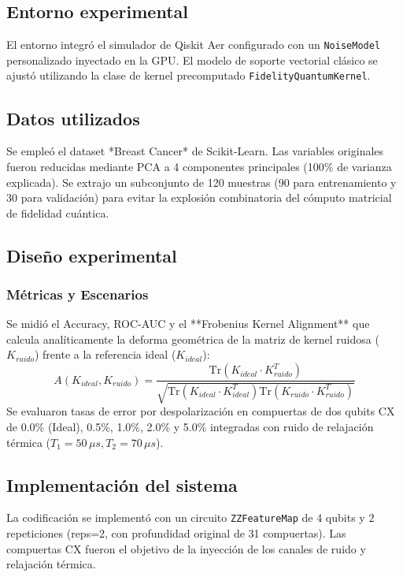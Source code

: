 \documentclass[12pt,oneside]{report}
\begin{document}
\subsection{Entorno experimental}
El entorno integró el simulador de Qiskit Aer configurado con un \texttt{NoiseModel} personalizado inyectado en la GPU. El modelo de soporte vectorial clásico se ajustó utilizando la clase de kernel precomputado \texttt{FidelityQuantumKernel}.

\subsection{Datos utilizados}
Se empleó el dataset *Breast Cancer* de Scikit-Learn. Las variables originales fueron reducidas mediante PCA a 4 componentes principales (100\% de varianza explicada). Se extrajo un subconjunto de 120 muestras (90 para entrenamiento y 30 para validación) para evitar la explosión combinatoria del cómputo matricial de fidelidad cuántica.

\subsection{Diseño experimental}
\subsubsection{Métricas y Escenarios}
Se midió el Accuracy, ROC-AUC y el **Frobenius Kernel Alignment** que calcula analíticamente la deforma geométrica de la matriz de kernel ruidosa ($K_{ruido}$) frente a la referencia ideal ($K_{ideal}$):
\begin{equation}
    A(K_{ideal}, K_{ruido}) = \frac{\text{Tr}(K_{ideal} \cdot K_{ruido}^T)}{\sqrt{\text{Tr}(K_{ideal} \cdot K_{ideal}^T)\text{Tr}(K_{ruido} \cdot K_{ruido}^T)}}
\end{equation}
Se evaluaron tasas de error por despolarización en compuertas de dos qubits CX de 0.0\% (Ideal), 0.5\%, 1.0\%, 2.0\% y 5.0\% integradas con ruido de relajación térmica ($T_1 = 50\,\mu s, T_2 = 70\,\mu s$).

\subsection{Implementación del sistema}
La codificación se implementó con un circuito \texttt{ZZFeatureMap} de 4 qubits y 2 repeticiones (reps=2, con profundidad original de 31 compuertas). Las compuertas CX fueron el objetivo de la inyección de los canales de ruido y relajación térmica.
\end{document}

